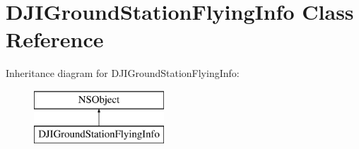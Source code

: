 \hypertarget{interface_d_j_i_ground_station_flying_info}{\section{D\+J\+I\+Ground\+Station\+Flying\+Info Class Reference}
\label{interface_d_j_i_ground_station_flying_info}
}
Inheritance diagram for D\+J\+I\+Ground\+Station\+Flying\+Info\+:\begin{figure}[H]
\begin{center}
\leavevmode
\includegraphics[height=2.000000cm]{interface_d_j_i_ground_station_flying_info}
\end{center}
\end{figure}
